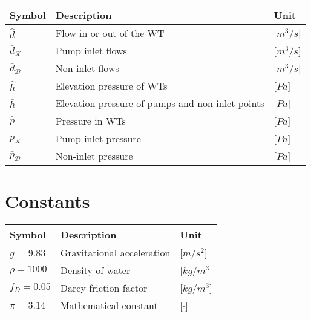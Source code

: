 \begin{tabular}{l l l} 
	\textbf{Symbol}		&	\textbf{Description}							& \hspace{26mm}\textbf{Unit}			\\\hline						
	$\hat{d}$			&	Flow in or out of the WT			    		& \hspace{26mm}[$m^3/s$]\\
	$\bar{d}_{\mathcal{K}}$	&	Pump inlet flows							& \hspace{26mm}[$m^3/s$]\\
	$\bar{d}_{\mathcal{D}}$	&	Non-inlet flows								& \hspace{26mm}[$m^3/s$]\\
	$\hat{h}$			&	Elevation pressure of WTs		    			& \hspace{26mm}[$Pa$]\\
	$\bar{h}$			&	Elevation pressure of pumps and non-inlet points& \hspace{26mm}[$Pa$]\\
	$\hat{p}$			&	Pressure in WTs				    				& \hspace{26mm}[$Pa$]\\
	$\bar{p}_{\mathcal{K}}$	&	Pump inlet pressure							& \hspace{26mm}[$Pa$]\\
	$\bar{p}_{\mathcal{D}}$	&	Non-inlet pressure							& \hspace{26mm}[$Pa$]\\
\end{tabular}

\section*{Constants}

\begin{tabular}{l l l} 
	\textbf{Symbol}		&	\textbf{Description}							& \hspace{59mm}\textbf{Unit}			\\\hline						
	$g$ = 9.83 			&	Gravitational acceleration						& \hspace{59mm}[$m/s^2$]\\
	$\rho = 1000$		&	Density of water								& \hspace{59mm}[$kg/m^3$]\\
	$f_D = 0.05$		&	Darcy friction factor							& \hspace{59mm}[$kg/m^3$]\\
	$\pi = 3.14$		&	Mathematical constant							& \hspace{59mm}[$\cdot$]\\
\end{tabular}

